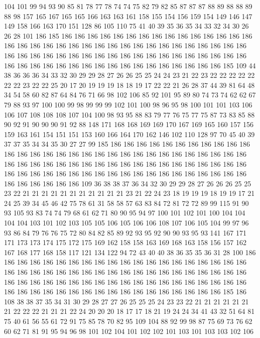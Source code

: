 104 101 99 94 93 90 85 81 78 77 78 74 74 75 82 79 82 85 87 87
87 88 89 88 88 89 88 98 157 165 167 165 165 166 163 163 161 158 155 154
156 159 154 149 146 147 149 158 166 163 170 151 128 86 105 110 75 41 40 39
35 36 35 34 33 32 34 30 26 26 28 101 186 185 186 186 186 186 186 186
186 186 186 186 186 186 186 186 186 186 186 186 186 186 186 186 186 186 186 186
186 186 186 186 186 186 186 186 186 186 186 186 186 186 186 186 186 186 186 186
186 186 186 186 186 186 186 186 186 186 186 186 186 186 186 186 186 186 186 186
186 186 186 186 185 109 44 38 36 36 36 34 33 32 30 29 29 28 27 26
26 25 25 24 24 23 21 22 23 22 22 22 22 22 22 22 23 22 22 25
20 17 20 19 19 19 18 18 19 17 22 22 21 26 28 37 44 39 81 64
48 34 54 58 60 82 87 64 84 76 71 66 98 102 106 85 92 101 95 89
80 74 73 74 62 62 67 79 88 93 97 100 100 99 98 99 99 99 102 101
100 98 96 95 98 100 101 101 103 106 106 107 108 108 108 107 104 100 98 93
95 88 83 79 77 76 75 77 75 87 73 83 85 88 90 92 91 90 90 90
91 92 88 148 171 168 168 169 169 170 167 169 165 160 157 156 159 163 161 154
151 151 153 160 166 164 170 162 146 102 110 128 97 70 45 40 39 37 37 35
34 34 35 30 27 27 99 185 186 186 186 186 186 186 186 186 186 186 186 186
186 186 186 186 186 186 186 186 186 186 186 186 186 186 186 186 186 186 186 186
186 186 186 186 186 186 186 186 186 186 186 186 186 186 186 186 186 186 186 186
186 186 186 186 186 186 186 186 186 186 186 186 186 186 186 186 186 186 186 186
186 186 109 36 38 38 37 36 34 32 30 29 29 28 27 26 26 26 25 25
23 22 21 21 21 21 21 21 21 21 21 21 21 23 21 22 24 23 18 19
19 19 18 19 19 17 21 24 25 39 34 45 46 42 75 78 61 31 58 58
57 63 83 84 72 81 72 72 89 99 115 91 90 93 105 93 83 74 74 79
68 61 62 71 80 90 95 94 97 100 101 102 101 100 104 104 104 104 103 101
102 103 105 105 106 105 106 106 108 107 106 105 104 99 97 96 93 86 84 79
76 76 75 72 80 84 82 85 89 92 93 95 92 90 90 93 95 93 141 167
171 171 173 173 174 175 172 175 169 162 158 158 163 169 168 163 158 156 157 162
167 168 177 168 158 117 121 134 122 94 72 43 40 40 38 36 35 35 36 31
28 100 186 186 186 186 186 186 186 186 186 186 186 186 186 186 186 186 186 186
186 186 186 186 186 186 186 186 186 186 186 186 186 186 186 186 186 186 186 186
186 186 186 186 186 186 186 186 186 186 186 186 186 186 186 186 186 186 186 186
186 186 186 186 186 186 186 186 186 186 186 186 186 186 186 186 186 185 186 108
38 38 37 35 34 31 30 29 28 27 27 26 25 25 25 24 23 23 22 21
21 21 21 21 21 21 22 22 22 21 21 21 22 24 20 20 20 18 17 17
18 21 19 24 24 34 41 43 32 51 64 81 75 40 61 56 55 61 72 91
75 85 78 70 82 95 109 104 88 92 99 98 87 75 69 73 76 62 60 62
71 81 91 95 94 96 98 101 102 104 101 102 102 101 103 101 103 103 102 106
